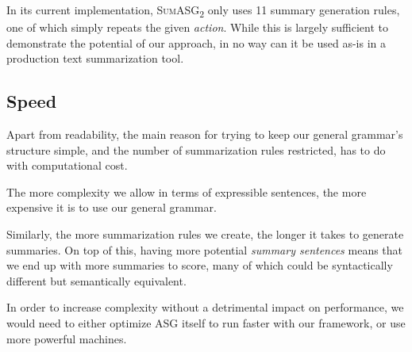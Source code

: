 In its current implementation, \textsc{SumASG\textsubscript{2}} only uses 11 summary generation rules, one of which simply repeats the given \textit{action}. While this is largely sufficient to demonstrate the potential of our approach, in no way can it be used as-is in a production text summarization tool.

\subsection{Speed}

Apart from readability, the main reason for trying to keep our general grammar's structure simple, and the number of summarization rules restricted, has to do with computational cost.

The more complexity we allow in terms of expressible sentences, the more expensive it is to use our general grammar.

Similarly, the more summarization rules we create, the longer it takes to generate summaries. On top of this, having more potential \textit{summary sentences} means that we end up with more summaries to score, many of which could be syntactically different but semantically equivalent.

In order to increase complexity without a detrimental impact on performance, we would need to either optimize ASG itself to run faster with our framework, or use more powerful machines.